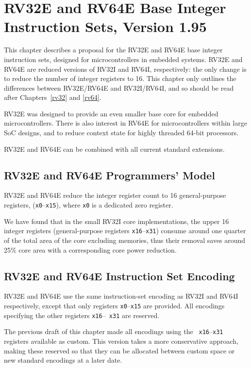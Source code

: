 \chapter{RV32E and RV64E Base Integer Instruction Sets, Version 1.95}
\label{rv32e}

This chapter describes a proposal for the RV32E and RV64E base integer
instruction sets, designed for microcontrollers in embedded systems.
RV32E and RV64E are reduced versions of RV32I and RV64I, respectively:
the only change is to reduce the number of integer registers to 16.
This chapter only outlines the differences between RV32E/RV64E and
RV32I/RV64I, and so should be read after Chapters~\ref{rv32} and
\ref{rv64}.

\begin{commentary}
RV32E was designed to provide an even smaller base core for embedded
microcontrollers.  There is also interest in RV64E for
microcontrollers within large SoC designs, and to reduce context state
for highly threaded 64-bit processors.

RV32E and RV64E can be combined with all current standard extensions.
\end{commentary}

\section{RV32E and RV64E Programmers' Model}

RV32E and RV64E reduce the integer register count to 16
general-purpose registers, ({\tt x0}--{\tt x15}), where {\tt x0} is a
dedicated zero register.

\begin{commentary}
We have found that in the small RV32I core implementations, the upper
16 integer registers (general-purpose registers {\tt x16}--{\tt x31}) 
consume around one quarter of the total area of the core
excluding memories, thus their removal saves around 25\% core area
with a corresponding core power reduction.
\end{commentary}

\section{RV32E and RV64E Instruction Set Encoding}

RV32E and RV64E use the same instruction-set encoding as RV32I and
RV64I respectively, except that only registers {\tt x0}--{\tt x15} are
provided.  All encodings specifying the other registers {\tt x16}--{\tt
  x31} are reserved.

\begin{commentary}
The previous draft of this chapter made all encodings using the {\tt
  x16}--{\tt x31} registers available as custom.  This version takes a
more conservative approach, making these reserved so that they can be
allocated between custom space or new standard encodings at a later
date.
\end{commentary}
